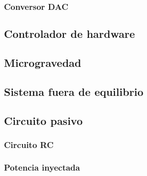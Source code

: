 \documentclass[11pt,letterpaper]{article}
\begin{document}
\subsubsection{Conversor DAC}
\subsection{Controlador de hardware}
\subsection{Microgravedad}
\subsection{Sistema fuera de equilibrio}
\subsection{Circuito pasivo}
\subsubsection{Circuito RC}
\subsubsection{Potencia inyectada}
\end{document}
